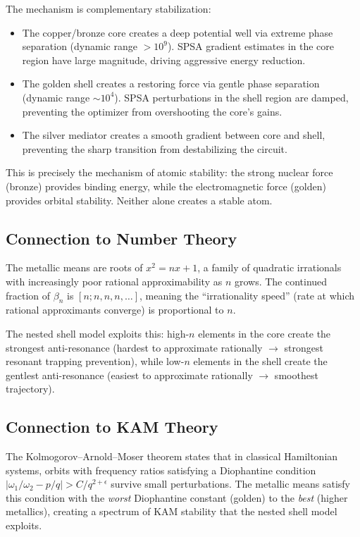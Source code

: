 \documentclass[twocolumn,showpacs,preprintnumbers,amsmath,amssymb,aps,prl]{revtex4-2}
\begin{document}
The mechanism is complementary stabilization:
\begin{itemize}
    \item The copper/bronze core creates a deep potential well via extreme phase separation (dynamic range $>10^9$). SPSA gradient estimates in the core region have large magnitude, driving aggressive energy reduction.
    \item The golden shell creates a restoring force via gentle phase separation (dynamic range $\sim 10^4$). SPSA perturbations in the shell region are damped, preventing the optimizer from overshooting the core's gains.
    \item The silver mediator creates a smooth gradient between core and shell, preventing the sharp transition from destabilizing the circuit.
\end{itemize}

This is precisely the mechanism of atomic stability: the strong nuclear force (bronze) provides binding energy, while the electromagnetic force (golden) provides orbital stability. Neither alone creates a stable atom.

\subsection{Connection to Number Theory}

The metallic means are roots of $x^2 = nx + 1$, a family of quadratic irrationals with increasingly poor rational approximability as $n$ grows. The continued fraction of $\beta_n$ is $[n; n, n, n, \ldots]$, meaning the ``irrationality speed'' (rate at which rational approximants converge) is proportional to $n$.

The nested shell model exploits this: high-$n$ elements in the core create the strongest anti-resonance (hardest to approximate rationally $\to$ strongest resonant trapping prevention), while low-$n$ elements in the shell create the gentlest anti-resonance (easiest to approximate rationally $\to$ smoothest trajectory).

\subsection{Connection to KAM Theory}

The Kolmogorov--Arnold--Moser theorem states that in classical Hamiltonian systems, orbits with frequency ratios satisfying a Diophantine condition $|\omega_1/\omega_2 - p/q| > C/q^{2+\epsilon}$ survive small perturbations. The metallic means satisfy this condition with the \emph{worst} Diophantine constant (golden) to the \emph{best} (higher metallics), creating a spectrum of KAM stability that the nested shell model exploits.
\end{document}
